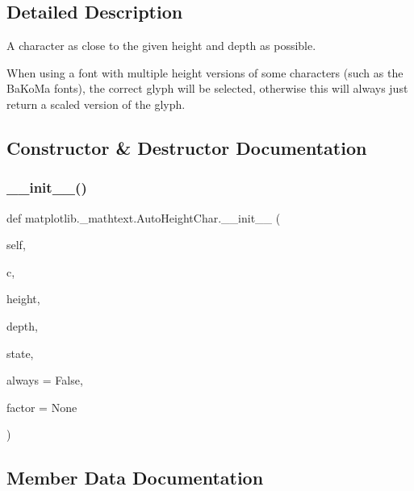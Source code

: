 \subsection{Detailed Description}
\begin{DoxyVerb}A character as close to the given height and depth as possible.

When using a font with multiple height versions of some characters (such as
the BaKoMa fonts), the correct glyph will be selected, otherwise this will
always just return a scaled version of the glyph.
\end{DoxyVerb}
 

\subsection{Constructor \& Destructor Documentation}
\mbox{\label{classmatplotlib_1_1__mathtext_1_1AutoHeightChar_a0fead496d36e683c65eabe8b3be1c1b3}} 
\subsubsection{\texorpdfstring{\+\_\+\+\_\+init\+\_\+\+\_\+()}{\_\_init\_\_()}}
{\footnotesize\ttfamily def matplotlib.\+\_\+mathtext.\+Auto\+Height\+Char.\+\_\+\+\_\+init\+\_\+\+\_\+ (\begin{DoxyParamCaption}\item[{}]{self,  }\item[{}]{c,  }\item[{}]{height,  }\item[{}]{depth,  }\item[{}]{state,  }\item[{}]{always = {\ttfamily False},  }\item[{}]{factor = {\ttfamily None} }\end{DoxyParamCaption})}



\subsection{Member Data Documentation}
\mbox{\label{classmatplotlib_1_1__mathtext_1_1AutoHeightChar_aa3d10c7511b8575f8b839cd38e639543}} 
